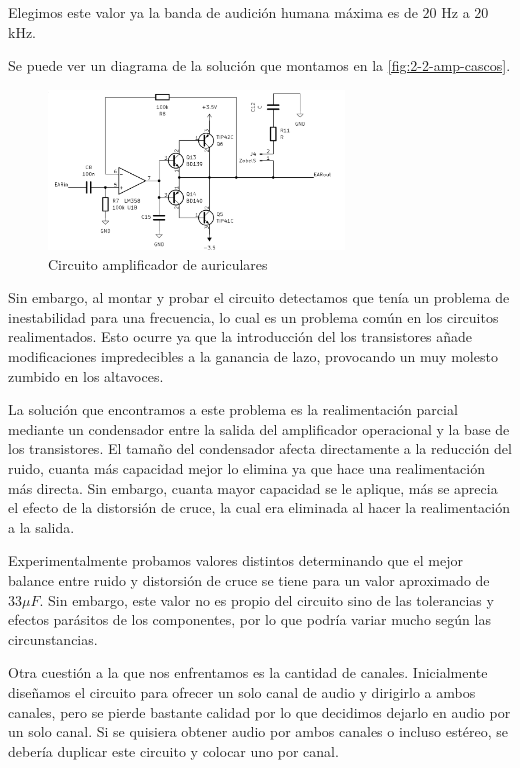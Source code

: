 Elegimos este valor ya la banda de audición humana máxima es de $20$ Hz a $20$ kHz.

Se puede ver un diagrama de la solución que montamos en la \autoref{fig:2-2-amp-cascos}.

\begin{figure}[h]
    \centering
    \includegraphics[width=0.7\textwidth]{images/2/2-2/circuitoAmplificadorCascos.png}
    \caption{Circuito amplificador de auriculares}
    \label{fig:2-2-amp-cascos}
\end{figure}

Sin embargo, al montar y probar el circuito detectamos que tenía un problema de inestabilidad para una frecuencia, lo cual es un problema común en los circuitos realimentados. Esto ocurre ya que la introducción del los transistores añade modificaciones impredecibles a la ganancia de lazo, provocando un muy molesto zumbido en los altavoces.

La solución que encontramos a este problema es la realimentación parcial mediante un condensador entre la salida del amplificador operacional y la base de los transistores. El tamaño del condensador afecta directamente a la reducción del ruido, cuanta más capacidad mejor lo elimina ya que hace una realimentación más directa. Sin embargo, cuanta mayor capacidad se le aplique, más se aprecia el efecto de la distorsión de cruce, la cual era eliminada al hacer la realimentación a la salida.

Experimentalmente probamos valores distintos determinando que el mejor balance entre ruido y distorsión de cruce se tiene para un valor aproximado de $33 \mu F$. Sin embargo, este valor no es propio del circuito sino de las tolerancias y efectos parásitos de los componentes, por lo que podría variar mucho según las circunstancias.

Otra cuestión a la que nos enfrentamos es la cantidad de canales. Inicialmente diseñamos el circuito para ofrecer un solo canal de audio y dirigirlo a ambos canales, pero se pierde bastante calidad por lo que decidimos dejarlo en audio por un solo canal. Si se quisiera obtener audio por ambos canales o incluso estéreo, se debería duplicar este circuito y colocar uno por canal.

